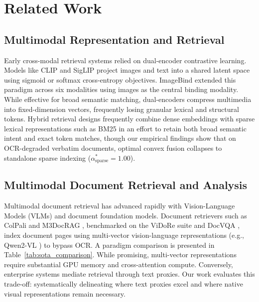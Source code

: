 \begin{enumerate}
\end{enumerate}

\section{Related Work}
\label{sec:related_work}

\subsection{Multimodal Representation and Retrieval}
Early cross-modal retrieval systems relied on dual-encoder contrastive learning. Models like CLIP \cite{radford2021clip} and SigLIP \cite{zhai2023siglip} project images and text into a shared latent space using sigmoid or softmax cross-entropy objectives. ImageBind \cite{girdhar2023imagebind} extended this paradigm across six modalities using images as the central binding modality. While effective for broad semantic matching, dual-encoders compress multimedia into fixed-dimension vectors, frequently losing granular lexical and structural tokens. Hybrid retrieval designs frequently combine dense embeddings with sparse lexical representations such as BM25 \cite{robertson2009bm25, robertson1995okapi} in an effort to retain both broad semantic intent and exact token matches, though our empirical findings show that on OCR-degraded verbatim documents, optimal convex fusion collapses to standalone sparse indexing ($\alpha_{\text{sparse}}^* = 1.00$).

\subsection{Multimodal Document Retrieval and Analysis}
Multimodal document retrieval has advanced rapidly with Vision-Language Models (VLMs) and document foundation models. Document retrievers such as ColPali \cite{faysse2024colpali} and M3DocRAG \cite{cho2024m3docrag}, benchmarked on the ViDoRe suite \cite{faysse2024colpali} and DocVQA \cite{mathew2021docvqa}, index document pages using multi-vector vision-language representations (e.g., Qwen2-VL \cite{wang2024qwen2vl}) to bypass OCR. A paradigm comparison is presented in Table~\ref{tab:sota_comparison}. While promising, multi-vector representations require substantial GPU memory and cross-attention compute. Conversely, enterprise systems \cite{patel2025multimodal, joshi2024multimodel} mediate retrieval through text proxies. Our work evaluates this trade-off: systematically delineating where text proxies excel and where native visual representations remain necessary.



